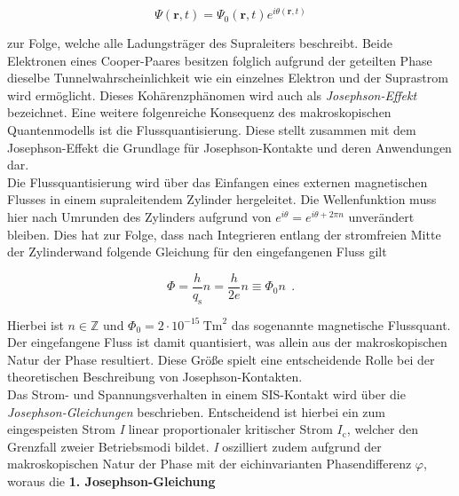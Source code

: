 \begin{equation}
\Psi(\textbf{r},t) = \Psi_0(\textbf{r},t)e^{i\theta(\textbf{r},t)}
\end{equation}

zur Folge, welche alle Ladungsträger des Supraleiters beschreibt. Beide Elektronen eines Cooper-Paares besitzen folglich aufgrund der geteilten Phase dieselbe Tunnelwahrscheinlichkeit wie ein einzelnes Elektron und der Suprastrom wird ermöglicht. 
Dieses Kohärenzphänomen wird auch als \textit{Josephson-Effekt} bezeichnet.
Eine weitere folgenreiche Konsequenz des makroskopischen Quantenmodells ist die Flussquantisierung. Diese stellt zusammen  mit dem Josephson-Effekt die Grundlage für Josephson-Kontakte und deren Anwendungen dar. \\ 

Die Flussquantisierung wird über das Einfangen eines externen magnetischen Flusses in einem supraleitendem Zylinder hergeleitet. Die Wellenfunktion muss hier nach Umrunden des Zylinders aufgrund von $e^{i\theta}=e^{i\theta + 2\pi n}$ unverändert bleiben. Dies hat zur Folge, dass nach Integrieren entlang der stromfreien Mitte der Zylinderwand folgende Gleichung für den eingefangenen Fluss gilt

\begin{equation}
\Phi = \frac{h}{q_\mathrm{s}}n = \frac{h}{2e}n \equiv \Phi_0n \ \ .
\end{equation}

Hierbei ist $n\in\mathbb{Z}$ und $\Phi_0 = 2\cdot 10^{-15} \ \mathrm{Tm}^2$ das sogenannte magnetische Flussquant. Der eingefangene Fluss ist damit quantisiert, was allein aus der makroskopischen Natur der Phase resultiert. Diese Größe spielt eine entscheidende Rolle bei der theoretischen Beschreibung von Josephson-Kontakten. \\

Das Strom- und Spannungsverhalten in einem SIS-Kontakt wird über die \textit{Josephson-Gleichungen} beschrieben. Entscheidend ist hierbei ein zum eingespeisten Strom \textit{I} linear proportionaler kritischer Strom \textit{$I_\mathrm{c}$}, welcher den Grenzfall zweier Betriebsmodi bildet. \textit{I} oszilliert zudem aufgrund der makroskopischen Natur der Phase mit der eichinvarianten Phasendifferenz $\varphi$, woraus die \textbf{1. Josephson-Gleichung}


